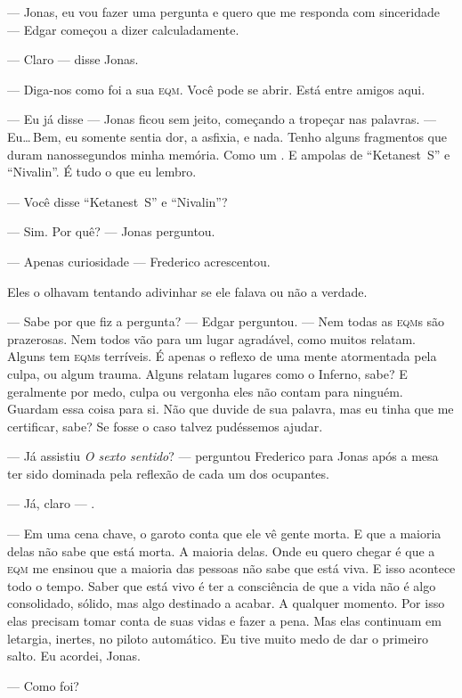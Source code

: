 --- Jonas, eu vou  fazer uma pergunta\mudanca{,} e quero que me responda com sinceridade --- Edgar começou a dizer\mudanca{,} calculadamente.

--- Claro --- disse Jonas.

--- Diga-nos como foi a sua \textsc{eqm}. Você pode se abrir. Está entre amigos aqui.

--- Eu já disse --- Jonas ficou sem jeito, começando a tropeçar nas palavras. --- Eu\ldots\,Bem, eu somente sentia dor, a asfixia, e nada. Tenho alguns fragmentos que duram nanossegundos minha memória. Como um . E ampolas de ``Ketanest~S'' e ``Nivalin''. É tudo o que eu lembro.

--- Você disse ``Ketanest~S'' e ``Nivalin''?

--- Sim. Por quê? --- Jonas perguntou.

--- Apenas curiosidade --- Frederico acrescentou.

Eles o olhavam tentando adivinhar se ele falava ou não a verdade.

--- Sabe por que fiz a pergunta? --- Edgar perguntou. --- Nem todas as \textsc{eqm}s são prazerosas. Nem todos vão para um lugar agradável, como muitos relatam. Alguns tem \textsc{eqm}s terríveis. É apenas o reflexo de uma mente atormentada pela culpa, ou algum trauma. Alguns relatam lugares como o Inferno, sabe? E geralmente por medo, culpa ou vergonha eles não contam para ninguém. Guardam essa coisa para si. Não que duvide de sua palavra, mas eu tinha que me certificar, sabe? Se fosse o caso talvez pudéssemos ajudar.

--- Já assistiu \emph{O sexto sentido\/}? --- perguntou Frederico para Jonas após a mesa ter sido dominada pela reflexão de cada um dos ocupantes.

--- Já, claro --- .

--- Em uma cena chave, o garoto conta que ele vê gente morta. E que a maioria delas não sabe que está morta. A maioria delas. Onde eu quero chegar é que a \textsc{eqm} me ensinou que a maioria das pessoas não sabe que está viva. E isso acontece todo o tempo. Saber que está vivo é ter a consciência de que a vida não é algo consolidado, sólido, mas algo destinado a acabar. A qualquer momento. Por isso elas precisam tomar conta de suas vidas e fazer  a pena. Mas elas continuam em letargia, inertes, no piloto automático. Eu tive muito medo de dar o primeiro salto. Eu acordei, Jonas.

--- Como foi?

